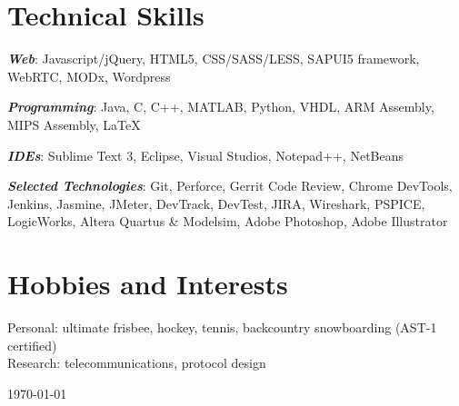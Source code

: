 \documentclass[letterpaper]{article}
\newcommand{\itemdescription}[3]{
  \textbf{#1}, {#2} \hfill \emph{#3}\\
  \medskip
}
\begin{document}
\section*{Technical Skills}
\emph{\textbf{Web}}: Javascript/jQuery, HTML5, CSS/SASS/LESS, SAPUI5 framework,
WebRTC, MODx, Wordpress
\medskip

\emph{\textbf{Programming}}: Java, C, C++, MATLAB, Python, VHDL, ARM Assembly,
MIPS Assembly, \LaTeX\\
\medskip

\emph{\textbf{IDEs}}: Sublime Text 3, Eclipse, Visual Studios, Notepad++,
NetBeans
\medskip

\emph{\textbf{Selected Technologies}}: Git, Perforce, Gerrit Code
Review, Chrome DevTools, Jenkins, Jasmine, JMeter, DevTrack, DevTest, JIRA,
Wireshark, PSPICE, LogicWorks, Altera Quartus \& Modelsim, Adobe Photoshop,
Adobe Illustrator
\bigskip










\section*{Hobbies and Interests}
Personal: ultimate frisbee, hockey, tennis, backcountry snowboarding (AST-1
certified)
\\
Research: telecommunications, protocol design

\vfill \hfill \monthyeardate\today
\end{document}
